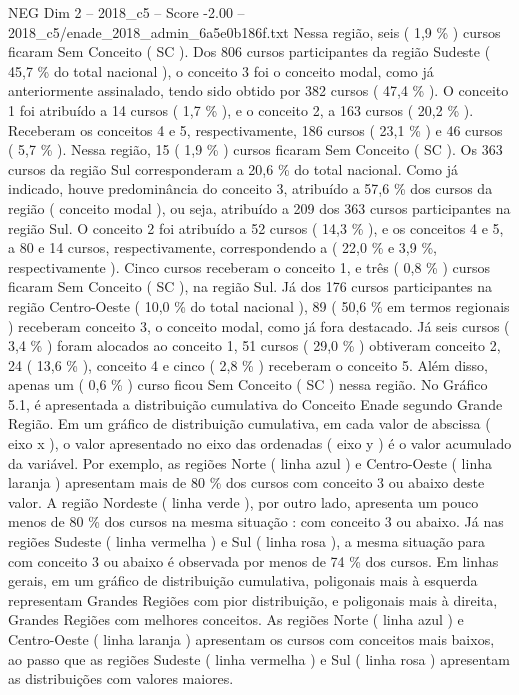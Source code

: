 \begin{textsample}{NEG Dim 2 – 2018\_c5 – Score -2.00 – 2018\_c5/enade\_2018\_admin\_6a5e0b186f.txt}
Nessa região, seis ( 1,9 \% ) cursos ficaram Sem Conceito ( SC ).
Dos 806 cursos participantes da região Sudeste ( 45,7 \% do total nacional ), o conceito 3 foi o conceito modal, como já anteriormente assinalado, tendo sido obtido por 382 cursos ( 47,4 \% ).
O conceito 1 foi atribuído a 14 cursos ( 1,7 \% ), e o conceito 2, a 163 cursos ( 20,2 \% ).
Receberam os conceitos 4 e 5, respectivamente, 186 cursos ( 23,1 \% ) e 46 cursos ( 5,7 \% ).
Nessa região, 15 ( 1,9 \% ) cursos ficaram Sem Conceito ( SC ).
Os 363 cursos da região Sul corresponderam a 20,6 \% do total nacional.
Como já indicado, houve predominância do conceito 3, atribuído a 57,6 \% dos cursos da região ( conceito modal ), ou seja, atribuído a 209 dos 363 cursos participantes na região Sul.
O conceito 2 foi atribuído a 52 cursos ( 14,3 \% ), e os conceitos 4 e 5, a 80 e 14 cursos, respectivamente, correspondendo a ( 22,0 \% e 3,9 \%, respectivamente ).
Cinco cursos receberam o conceito 1, e três ( 0,8 \% ) cursos ficaram Sem Conceito ( SC ), na região Sul.
Já dos 176 cursos participantes na região Centro-Oeste ( 10,0 \% do total nacional ), 89 ( 50,6 \% em termos regionais ) receberam conceito 3, o conceito modal, como já fora destacado.
Já seis cursos ( 3,4 \% ) foram alocados ao conceito 1, 51 cursos ( 29,0 \% ) obtiveram conceito 2, 24 ( 13,6 \% ), conceito 4 e cinco ( 2,8 \% ) receberam o conceito 5.
Além disso, apenas um ( 0,6 \% ) curso ficou Sem Conceito ( SC ) nessa região.
No Gráfico 5.1, é apresentada a distribuição cumulativa do Conceito Enade segundo Grande Região.
Em um gráfico de distribuição cumulativa, em cada valor de abscissa ( eixo x ), o valor apresentado no eixo das ordenadas ( eixo y ) é o valor acumulado da variável.
Por exemplo, as regiões Norte ( linha azul ) e Centro-Oeste ( linha laranja ) apresentam mais de 80 \% dos cursos com conceito 3 ou abaixo deste valor.
A região Nordeste ( linha verde ), por outro lado, apresenta um pouco menos de 80 \% dos cursos na mesma situação : com conceito 3 ou abaixo.
Já nas regiões Sudeste ( linha vermelha ) e Sul ( linha rosa ), a mesma situação para com conceito 3 ou abaixo é observada por menos de 74 \% dos cursos.
Em linhas gerais, em um gráfico de distribuição cumulativa, poligonais mais à esquerda representam Grandes Regiões com pior distribuição, e poligonais mais à direita, Grandes Regiões com melhores conceitos.
As regiões Norte ( linha azul ) e Centro-Oeste ( linha laranja ) apresentam os cursos com conceitos mais baixos, ao passo que as regiões Sudeste ( linha vermelha ) e Sul ( linha rosa ) apresentam as distribuições com valores maiores.

\end{textsample}
